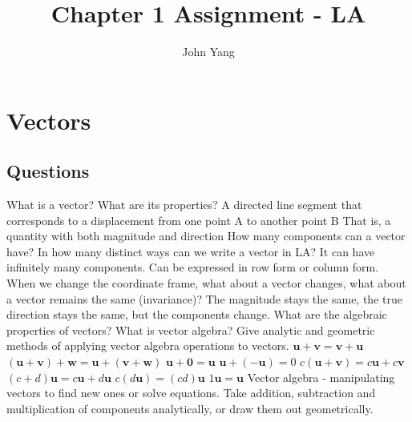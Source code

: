 \documentclass{article}
\title{Chapter 1 Assignment - LA} %
\author{John Yang}
\begin{document}
    \maketitle
    \tableofcontents
    \section{Vectors} %
    \subsection{Questions}
    \begin{outline}[enumerate]
        \1 What is a vector? What are its properties?
            \2 A directed line segment that corresponds to a displacement from one point A to another point B
            \2 That is, a quantity with both magnitude and direction 
        \1 How many components can a vector have? In how many distinct ways can we write a vector in LA?
            \2 It can have infinitely many components. Can be expressed in row form or column form. 
        \1 When we change the coordinate frame, what about a vector changes, what about a vector remains the same (invariance)?
            \2 The magnitude stays the same, the true direction stays the same, but the components change. 
        \1 What are the algebraic properties of vectors? What is vector algebra? Give analytic and geometric methods of applying vector algebra operations to vectors. 
            \2 \(\mathbf u+\mathbf v=\mathbf v+\mathbf u\)
            \2 \((\mathbf u+\mathbf v)+\mathbf w=\mathbf u+(\mathbf v+\mathbf w)\)
            \2 \(\mathbf u+\mathbf 0=\mathbf u\)
            \2 \(\mathbf u+(-\mathbf u)=0\)
            \2 \(c(\mathbf u+\mathbf v)=c\mathbf u+c\mathbf v\)
            \2 \((c+d)\mathbf u=c\mathbf u+d\mathbf u\)
            \2 \(c(d\mathbf u)=(cd)\mathbf u\)
            \2 \(1\mathbf u=\mathbf u\)
            \2 Vector algebra - manipulating vectors to find new ones or solve equations. Take addition, subtraction and multiplication of components analytically, or draw them out geometrically. 


\end{outline}
\end{document}

